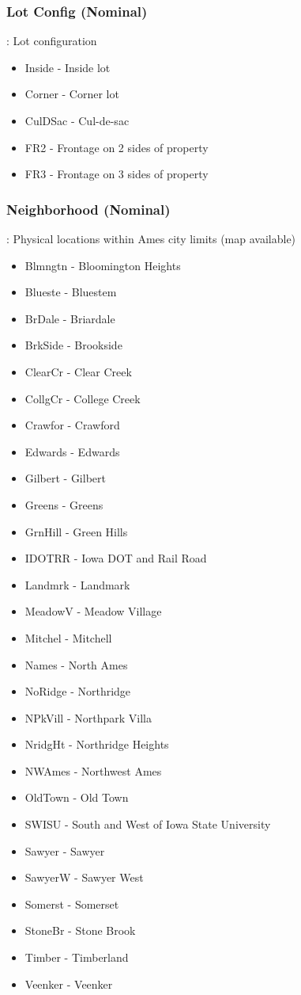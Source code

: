 \documentclass[sigconf]{acmart}
\begin{document}
	\subsubsection{Lot Config (Nominal)}: Lot configuration
	\begin{itemize}
		\item  Inside - Inside lot
		\item  Corner - Corner lot
		\item  CulDSac - Cul-de-sac
		\item  FR2 - Frontage on 2 sides of property
		\item  FR3 - Frontage on 3 sides of property
	\end{itemize}

	\subsubsection{Neighborhood (Nominal)}: Physical locations within Ames city limits (map available)
	\begin{itemize}
		\item  Blmngtn - Bloomington Heights
		\item  Blueste - Bluestem
		\item  BrDale - Briardale
		\item  BrkSide - Brookside
		\item  ClearCr - Clear Creek
		\item  CollgCr - College Creek
		\item  Crawfor - Crawford
		\item  Edwards - Edwards
		\item  Gilbert - Gilbert
		\item  Greens - Greens
		\item  GrnHill - Green Hills
		\item  IDOTRR - Iowa DOT and Rail Road
		\item  Landmrk - Landmark
		\item  MeadowV - Meadow Village
		\item  Mitchel - Mitchell
		\item  Names - North Ames
		\item  NoRidge - Northridge
		\item  NPkVill - Northpark Villa
		\item  NridgHt - Northridge Heights
		\item  NWAmes - Northwest Ames
		\item  OldTown - Old Town
		\item  SWISU - South and West of Iowa State University
		\item  Sawyer - Sawyer
		\item  SawyerW - Sawyer West
		\item  Somerst - Somerset
		\item  StoneBr - Stone Brook
		\item  Timber - Timberland
		\item  Veenker - Veenker
	\end{itemize}
\end{document}

